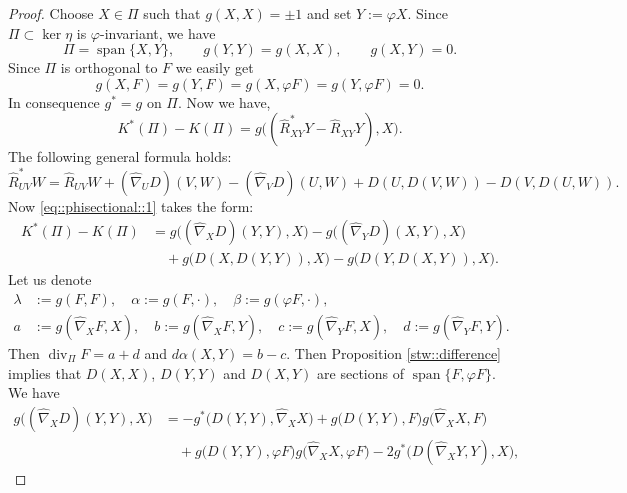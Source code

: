\documentclass[12pt,a4paper,final]{amsart}
\numberwithin{equation}{section}
\theoremstyle{df}
\newcommand{\Span}{\operatorname{span}}
\begin{document}
\begin{proof}
Choose $X\in\Pi$ such that $g(X,X)=\pm 1$
and set $Y:=\varphi X$.
Since $\Pi\subset\ker\eta$ is $\varphi$-invariant, we have
$$
\Pi=\Span\{X,Y\},
\qquad
g(Y,Y)=g(X,X),
\qquad
g(X,Y)=0.
$$
Since $\Pi$ is orthogonal to $F$ we easily get
$$
g(X,F)=g(Y,F)=g(X,\varphi F)=g(Y,\varphi F)=0.
$$
In consequence $g^\ast=g$ on $\Pi$. Now we have,
\begin{equation}\label{eq::phisectional::1}
K^\ast(\Pi)-K(\Pi)
=
g\bigl((\widehat{R}^\ast_{XY}Y-\widehat{R}_{XY}Y),X\bigr).
\end{equation}
The following general formula holds:
$$
\widehat{R}^\ast_{UV}W
=
\widehat{R}_{UV}W
+(\widehat{\nabla}_UD)(V,W)-(\widehat{\nabla}_VD)(U,W)
+D(U,D(V,W))-D(V,D(U,W)).
$$
Now \eqref{eq::phisectional::1} takes the form:
\begin{align*}\label{eq::phisectional::1b}
K^\ast(\Pi)-K(\Pi)
&=
g\bigl((\widehat{\nabla}_XD)(Y,Y),X\bigr)
-g\bigl((\widehat{\nabla}_YD)(X,Y),X\bigr)\\
\nonumber &\quad
+g\bigl(D(X,D(Y,Y)),X\bigr)
-g\bigl(D(Y,D(X,Y)),X\bigr).
\end{align*}
Let us denote
\begin{align*}
\lambda&:=g(F,F),\quad \alpha:=g(F,\cdot),\quad \beta:=g(\varphi F,\cdot),\\
a&:=g(\widehat{\nabla}_XF,X),\quad b:=g(\widehat{\nabla}_XF,Y),\quad
c:=g(\widehat{\nabla}_YF,X),\quad d:=g(\widehat{\nabla}_YF,Y).
\end{align*}
Then
$
\operatorname{div}_\Pi F=a+d$ and $ d\alpha(X,Y)=b-c.
$
Then
Proposition \ref{stw::difference} implies that $D(X,X)$, $D(Y,Y)$ and $D(X,Y)$
are sections of $\Span\{F,\varphi F\}$.
We have
\begin{align*}
g\bigl((\widehat{\nabla}_XD)(Y,Y),X\bigr)
&=
-g^\ast\bigl(D(Y,Y),\widehat{\nabla}_XX\bigr)
+g\bigl(D(Y,Y),F\bigr)g\bigl(\widehat{\nabla}_XX,F\bigr)\\
&\quad
+g\bigl(D(Y,Y),\varphi F\bigr)g\bigl(\widehat{\nabla}_XX,\varphi F\bigr)
-2g^\ast\bigl(D(\widehat{\nabla}_XY,Y),X\bigr),
\end{align*}



\end{proof}
\end{document}

